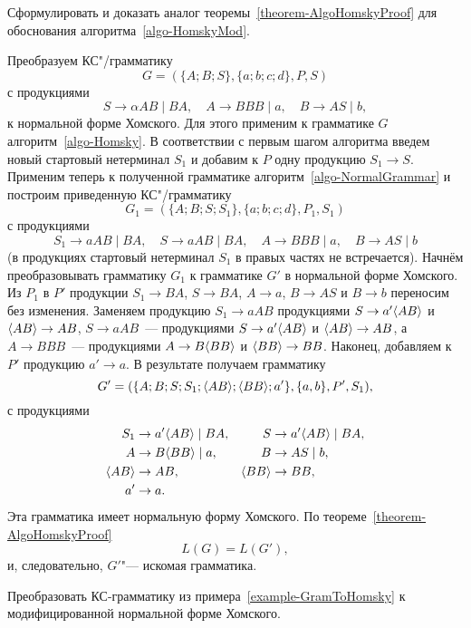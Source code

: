\begin{myproblem}
Сформулировать и доказать аналог теоремы~\ref{theorem-AlgoHomskyProof} для обоснования алгоритма~\ref{algo-HomskyMod}.
\end{myproblem}

\begin{myexample}
\label{example-GramToHomsky}
Преобразуем КС"/грамматику
\[
G = (\{A;B;S\},\{a;b;c;d\},P,S)
\]
с продукциями
\[
	S \to \alpha AB \mid BA, \quad
	A \to BBB \mid a, \quad
	B \to AS \mid b,
\]
к нормальной форме Хомского. Для этого применим к грамматике $G$
алгоритм~\ref{algo-Homsky}. В соответствии с первым шагом алгоритма введем новый
стартовый нетерминал $S_1$ и добавим к $P$ одну продукцию $S_1\to S$.
Применим теперь к полученной грамматике алгоритм~\ref{algo-NormalGrammar} и построим
приведенную КС"/грамматику
\[
    G_1 = (\{A;B;S;S_1\},\{a;b;c;d\},P_1,S_1)
\]
с продукциями
\[
	S_1 \to aAB \mid BA, \quad
	S \to aAB \mid BA, \quad
    A \to BBB \mid a, \quad
    B \to AS \mid b
\]
(в продукциях стартовый нетерминал $S_1$ в правых частях не
встречается). Начнём преобразовывать грамматику $G_1$ к грамматике
$G'$
в нормальной форме Хомского. Из $P_1$ в $P'$ продукции $S_1\to BA$,
$S\to BA$, $A\to a$, $B\to AS$ и $B\to b$ переносим без изменения.
Заменяем продукцию $S_1\to aAB$ продукциями $S\to a' \langle AB \rangle$  и $
\langle AB \rangle \to AB$, $S\to aAB$~--- продукциями $S\to a' \langle AB \rangle$ и $
\langle AB \rangle \to AB$, а $A\to BBB$~--- продукциями $A\to B \langle BB \rangle$ и
$ \langle BB \rangle \to BB$. Наконец, добавляем к $P'$ продукцию $a'\to a$. В
результате получаем грамматику
\[
    G' = (\{A;B;S;S_1;\langle AB \rangle; \langle BB \rangle; a'\},\{a,b\},P',S_1),
\]
с продукциями
\begin{align*}
	S_1 &\to a' \langle AB\rangle \mid BA, &
    S   &\to a'\langle AB\rangle  \mid BA, \\
    A   &\to B \langle BB\rangle \mid a, &
    B   &\to AS \mid b, \\
    \langle AB \rangle &\to AB, &
    \langle BB\rangle  &\to BB, \\
    a' &\to a.
\end{align*}
Эта грамматика имеет нормальную форму Хомского. По теореме~\ref{theorem-AlgoHomskyProof}
\[
    L(G)=L(G'),
\]
и, следовательно, $G'$"--- искомая грамматика.
\end{myexample}

\begin{myproblem}
Преобразовать КС-грамматику из примера~\ref{example-GramToHomsky} к модифицированной нормальной форме Хомского.
\end{myproblem}

